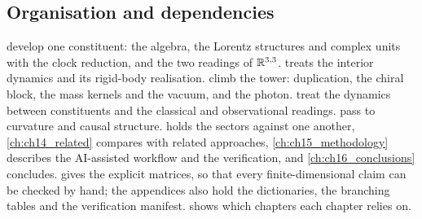 \subsection{Organisation and dependencies}
\label{sec:fm:organisation}

 develop one constituent: the algebra, the Lorentz structures and complex units with
the clock reduction, and the two readings of $\mathbb{R}^{3,3}$.  treats the interior dynamics and its rigid-body
realisation.  climb the tower: duplication, the chiral block, the mass kernels
and the vacuum, and the photon.  treat the dynamics between constituents and the classical and
observational readings.  pass to curvature and causal structure.  holds the
sectors against one another, \cref{ch:ch14_related} compares with related approaches, \cref{ch:ch15_methodology} describes the AI-assisted
workflow and the verification, and \cref{ch:ch16_conclusions} concludes.  gives the explicit matrices, so that every
finite-dimensional claim can be checked by hand; the appendices also hold the dictionaries, the branching tables and the verification
manifest.  shows which chapters each chapter relies on.

